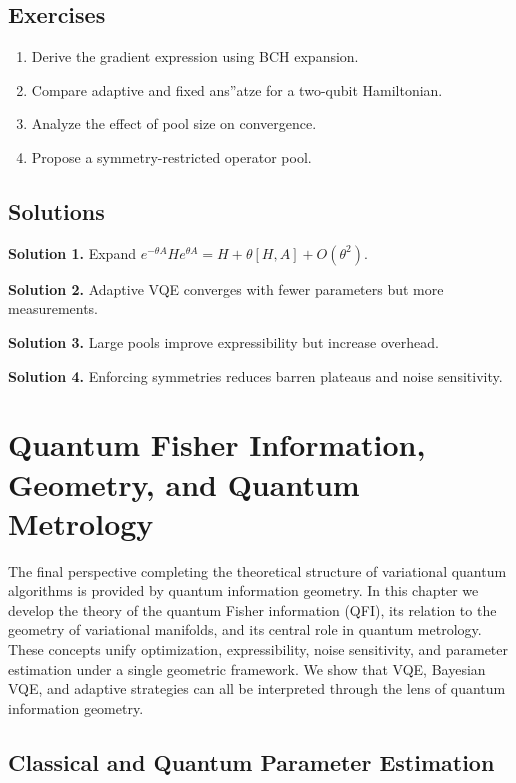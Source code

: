 \documentclass{book}
\begin{document}
\section{Exercises}

\begin{enumerate}
\item Derive the gradient expression using BCH expansion.
\item Compare adaptive and fixed ans”atze for a two-qubit Hamiltonian.
\item Analyze the effect of pool size on convergence.
\item Propose a symmetry-restricted operator pool.
\end{enumerate}

\section{Solutions}

\textbf{Solution 1.} Expand $e^{-\theta A} H e^{\theta A} = H + \theta[H,A] + O(\theta^2)$.

\textbf{Solution 2.} Adaptive VQE converges with fewer parameters but more measurements.

\textbf{Solution 3.} Large pools improve expressibility but increase overhead.

\textbf{Solution 4.} Enforcing symmetries reduces barren plateaus and noise sensitivity.


\chapter{Quantum Fisher Information, Geometry, and Quantum Metrology}

The final perspective completing the theoretical structure of variational quantum algorithms is provided by quantum information geometry. In this chapter we develop the theory of the quantum Fisher information (QFI), its relation to the geometry of variational manifolds, and its central role in quantum metrology. These concepts unify optimization, expressibility, noise sensitivity, and parameter estimation under a single geometric framework. We show that VQE, Bayesian VQE, and adaptive strategies can all be interpreted through the lens of quantum information geometry.

\section{Classical and Quantum Parameter Estimation}
\end{document}
